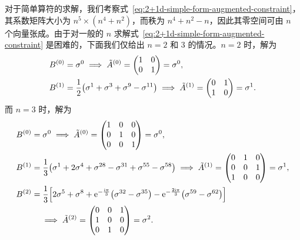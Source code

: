 对于简单算符的求解，我们考察式~\eqref{eq:2+1d-simple-form-augmented-constraint}，其系数矩阵大小为 $n^5\times(n^4+n^2)$，而秩为 $n^4+n^2-n$，因此其零空间可由 $n$ 个向量张成。由于对一般的 $n$ 求解式~\eqref{eq:2+1d-simple-form-augmented-constraint} 是困难的，下面我们仅给出 $n=2$ 和 3 的情况。$n=2$ 时，解为
\begin{align}
  B^{(0)} &= \sigma^0
    \implies \tilde{A}^{(0)} = \begin{pmatrix} 1 & 0 \\ 0 & 1 \end{pmatrix} = \sigma^0, \notag \\
  B^{(1)} &= \frac12 \bigl( \sigma^1 + \sigma^3 + \sigma^9 - \sigma^{11} \bigr)
    \implies \tilde{A}^{(1)} = \begin{pmatrix} 0 & 1 \\ 1 & 0 \end{pmatrix} = \sigma^1.
\end{align}
而 $n=3$ 时，解为
\begin{align}
  B^{(0)} &= \sigma^0
    \implies \tilde{A}^{(0)} = \begin{pmatrix} 1 & 0 & 0 \\ 0 & 1 & 0 \\ 0 & 0 & 1 \end{pmatrix} = \sigma^0, \notag \\
  B^{(1)} &= \frac13 \bigl( \sigma^1 + 2\sigma^4 + \sigma^{28} - \sigma^{31} + \sigma^{55} - \sigma^{58} \bigr)
    \implies \tilde{A}^{(1)} = \begin{pmatrix} 0 & 1 & 0 \\ 0 & 0 & 1 \\ 1 & 0 & 0 \end{pmatrix} = \sigma^1, \notag \\
  B^{(2)} &= \frac13 \Bigl[
      2\sigma^5 + \sigma^8 + \mathrm{e}^{-\frac{\mathrm{i}\pi}{3}} \bigl( \sigma^{32} - \sigma^{35} \bigr)
    - \mathrm{e}^{-\frac{2\mathrm{i}\pi}{3}} \bigl( \sigma^{59} - \sigma^{62} \bigr)
  \Bigr] \notag \\
    &\quad \implies \tilde{A}^{(2)} = \begin{pmatrix} 0 & 0 & 1 \\ 1 & 0 & 0 \\ 0 & 1 & 0 \end{pmatrix} = \sigma^2.
\end{align}

